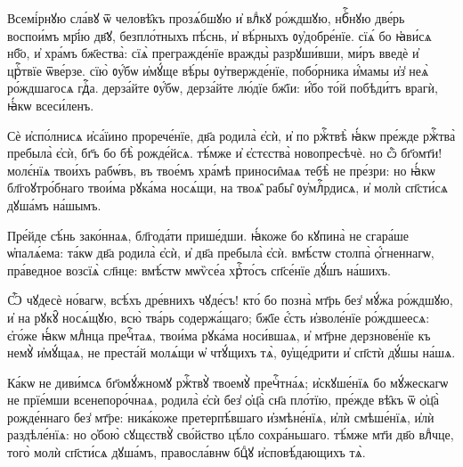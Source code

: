 
\label{bogorod} 


\cuLettrine
Всемі́рнꙋю сла́вꙋ ѿ человѣ̑къ прозѧ́бшꙋю и҆ влⷣкꙋ  ро́ждшꙋю, нбⷭ҇нꙋю две́рь воспои́мъ мр҃і́ю дв҃ꙋ, безпло́тныхъ  пѣ́снь, и҆ вѣ́рныхъ ᲂу҆добре́нїе. сїѧ́ бо ꙗ҆ви́сѧ нб҃о,  и҆ хра́мъ бж҃ества̀: сїѧ̀ прегражде́нїе вражды̀ разрꙋши́вши,  ми́ръ введѐ и҆ црⷭ҇твїе ѿве́рзе. сїю̀ ᲂу҆́бѡ и҆мꙋ́ще  вѣ́ры ᲂу҆твержде́нїе, побо́рника и҆́мамы и҆з̾ неѧ̀  ро́ждшагосѧ гдⷭ҇а. дерза́йте ᲂу҆́бѡ, дерза́йте лю́дїе  бж҃їи: и҆́бо то́й побѣди́тъ врагѝ, ꙗ҆́кѡ всеси́ленъ. 
%

\cuLettrine 
Сѐ и҆спо́лнисѧ и҆са́їино прорече́нїе, дв҃а родила̀ є҆сѝ,  и҆ по ржⷭ҇твѣ̀ ꙗ҆́кѡ пре́жде ржⷭ҇тва̀ пребыла̀ є҆сѝ,  бг҃ъ бо бѣ̀ рожде́йсѧ.   тѣ́мже и҆ є҆стєства̀ новопресѣчѐ. но ѽ бг҃омт҃и!  молє́нїѧ твои́хъ рабѡ́въ, въ твое́мъ хра́мѣ приноси̑маѧ  тебѣ̀ не пре́зри: но ꙗ҆́кѡ бл҃гоꙋтро́бнаго твои́ма рꙋка́ма  носѧ́щи, на твоѧ̑ рабы̑ ᲂу҆млⷭ҇рдисѧ, и҆ молѝ сп҃сти́сѧ  дꙋша́мъ на́шымъ. 
%

\cuLettrine
Пре́йде сѣ́нь зако́ннаѧ, бл҃года́ти прише́дши. ꙗ҆́коже бо  кꙋпина̀ не сгара́ше ѡ҆палѧ́ема: та́кѡ дв҃а родила̀ є҆сѝ,  и҆ дв҃а пребыла̀ є҆сѝ. вмѣ́стѡ столпа̀ ѻ҆́гненнагѡ,  пра́ведное возсїѧ̀ сл҃нце: вмѣ́стѡ мѡѷсе́а хрⷭ҇то́съ  сп҃се́нїе дꙋ́шъ на́шихъ. 
%

\cuLettrine
Ѽ чꙋдесѐ но́вагѡ, всѣ́хъ дре́внихъ чꙋде́съ! кто́ бо  позна̀ мт҃рь без̾ мꙋ́жа ро́ждшꙋю, и҆ на рꙋкꙋ̑ носѧ́щꙋю,  всю̀ тва́рь содержа́щаго; бж҃їе є҆́сть и҆зволе́нїе  ро́ждшеесѧ: є҆го́же ꙗ҆́кѡ млⷣнца пречⷭ҇таѧ, твои́ма  рꙋка́ма  носи́вшаѧ, и҆ мт҃рне  дерзнове́нїе къ немꙋ̀ и҆мꙋ́щаѧ, не преста́й молѧ́щи ѡ҆  чтꙋ́щихъ тѧ̀, ᲂу҆ще́дрити и҆ сп҃стѝ дꙋ́шы на́шѧ. 
%

\cuLettrine
Ка́кѡ не диви́мсѧ бг҃омꙋ́жномꙋ ржⷭ҇твꙋ̀ твоемꙋ̀ пречⷭ҇тна́ѧ;  и҆скꙋше́нїѧ бо мꙋ́жескагѡ не прїе́мши всенепоро́чнаѧ,  родила̀ є҆сѝ без̾ ѻ҆ц҃а̀ сн҃а пло́тїю, пре́жде вѣ̑къ  ѿ ѻ҆ц҃а̀ рожде́ннаго без̾ мт҃ре: ника́коже  претерпѣ́вшаго и҆змѣне́нїѧ, и҆лѝ смѣше́нїѧ, и҆лѝ  раздѣле́нїѧ: но ѻ҆бою̀ сꙋщєствꙋ̀ сво́йство цѣ́ло  сохра́ньшаго. тѣ́мже мт҃и дв҃о влⷣчце, того̀ молѝ  сп҃сти́сѧ дꙋша́мъ, правосла́внѡ бцⷣꙋ и҆сповѣ́дающихъ тѧ̀.  
%

